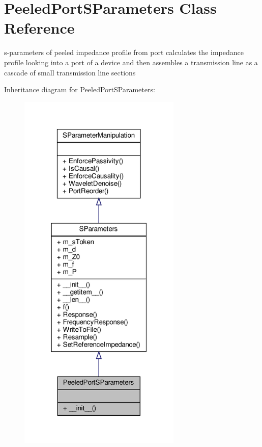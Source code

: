 \hypertarget{classSignalIntegrity_1_1ImpedanceProfile_1_1PeeledPortSParameters_1_1PeeledPortSParameters}{}\section{Peeled\+Port\+S\+Parameters Class Reference}
\label{classSignalIntegrity_1_1ImpedanceProfile_1_1PeeledPortSParameters_1_1PeeledPortSParameters}


s-\/parameters of peeled impedance profile from port calculates the impedance profile looking into a port of a device and then assembles a transmission line as a cascade of small transmission line sections  




Inheritance diagram for Peeled\+Port\+S\+Parameters\+:\nopagebreak
\begin{figure}[H]
\begin{center}
\leavevmode
\includegraphics[width=220pt]{classSignalIntegrity_1_1ImpedanceProfile_1_1PeeledPortSParameters_1_1PeeledPortSParameters__inherit__graph}
\end{center}
\end{figure}


